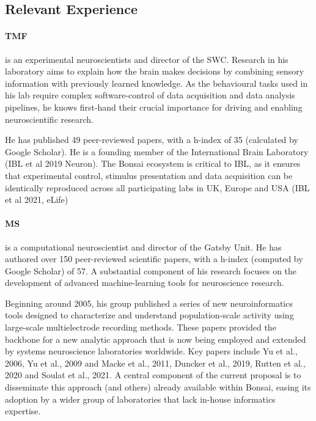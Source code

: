 
\subsection{Relevant Experience}

\paragraph{TMF} is an experimental
neuroscientists and director of the SWC. Research in his laboratory aims to
explain how the brain makes decisions by combining sensory information with
previously learned knowledge.  As the behavioural tasks used in his lab require
complex software-control of data acquisition and data analysis pipelines, he
knows first-hand their crucial importance for driving and enabling
neuroscientific research.

He has published 49 peer-reviewed papers, with a h-index of 35 (calculated by
Google Scholar).  He is a founding member of the International Brain Laboratory
(IBL et al 2019 Neuron). The Bonsai ecosystem is critical to IBL, as it ensures
that experimental control, stimulus presentation and data acquisition can be
identically reproduced across all participating labs in UK, Europe and USA (IBL
et al 2021, eLife)

\paragraph{MS} is a computational neuroscientist and director of the Gatsby
Unit. He has authored over 150 peer-reviewed scientific papers, with a h-index
(computed by Google Scholar) of 57. A substantial component of his research
focuses on the development of advanced machine-learning tools for
neuroscience research.

Beginning around 2005, his group published a series of new neuroinformatics
tools designed to characterize and understand population-scale activity using large-scale multielectrode recording methods. These papers
provided the backbone for a new analytic approach that is now being employed
and extended by systems neuroscience laboratories worldwide.
%
Key papers include Yu et al., 2006, Yu et al., 2009 and Macke et al., 2011,
Duncker et al., 2019, Rutten et al., 2020 and Soulat et al., 2021.
%
A central component of the current proposal is to disseminate this approach
(and others) already available within Bonsai, easing its adoption by a wider
group of laboratories that lack in-house informatics expertise.

